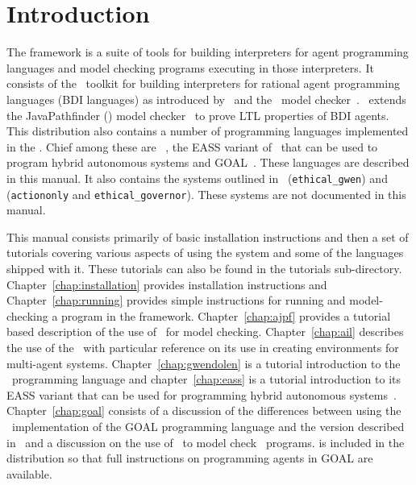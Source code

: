 \chapter{Introduction}

\begin{sloppypar}
The \mcapl{} framework is a suite of tools for building interpreters
for agent programming languages and  model checking programs
executing in those interpreters.  It consists of the \ail\ toolkit for building interpreters for rational agent programming languages (BDI languages) as introduced by~\cite{rao:92a} and the \ajpf\ model checker~\cite{MCAPL_journal}.  \ajpf\ extends the JavaPathfinder (\jpf) model checker~\cite{VisserHBPL03} to prove LTL properties of BDI agents.  This distribution also contains a number of programming languages implemented in the \ail.  Chief among these are \gwendolen~\cite{dennis17gwen}, the EASS variant of \gwendolen\ that can be used to program hybrid autonomous systems and GOAL~\cite{GOAL01}.  These languages are described in this manual.  It also contains the systems outlined in~\cite{Dennis2015} (\texttt{ethical\_gwen}) and~\cite{dennis15:_towar_verif_ethic_robot_behav} (\texttt{actiononly} and \texttt{ethical\_governor}).  These systems are not documented in this manual.
\end{sloppypar}

This manual consists primarily of basic installation instructions and then a set of tutorials covering various aspects of using the system and some of the languages shipped with it.  These tutorials can also be found in the tutorials sub-directory.  Chapter~\ref{chap:installation} provides installation instructions and Chapter~\ref{chap:running} provides simple instructions for running and model-checking a program in the framework.  Chapter~\ref{chap:ajpf} provides a tutorial based description of the use of \ajpf\ for model checking.  Chapter~\ref{chap:ail} describes the use of the \ail\ with particular reference on its use in creating environments for multi-agent systems.  Chapter~\ref{chap:gwendolen} is a tutorial introduction to the \gwendolen\ programming language and chapter~\ref{chap:eass} is a tutorial introduction to its EASS variant that can be used for programming hybrid autonomous systems~.  Chapter~\ref{chap:goal} consists of a discussion of the differences between using the \ail\ implementation of the GOAL programming language and the version described in~\cite{goalmanual} and a discussion on the use of \ajpf\ to model check \goal\ programs.  \cite{goalmanual} is included in the distribution so that full instructions on programming agents in GOAL are available.


